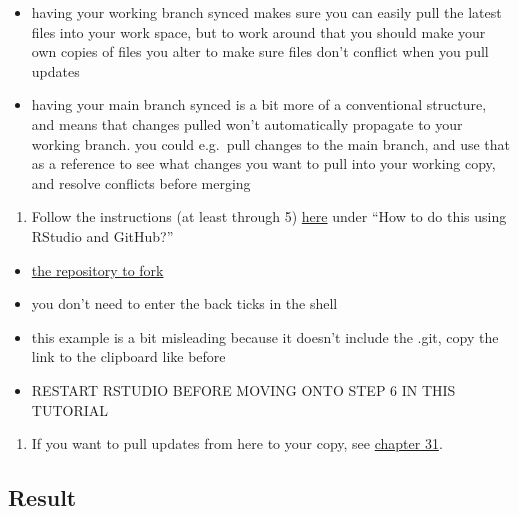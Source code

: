 \documentclass[
]{book}
\providecommand{\tightlist}{%
  \setlength{\itemsep}{0pt}\setlength{\parskip}{0pt}}
\begin{document}
\begin{itemize}
\tightlist
\item
  having your working branch synced makes sure you can easily pull the latest files into your work space, but to work around that you should make your own copies of files you alter to make sure files don't conflict when you pull updates\\
\item
  having your main branch synced is a bit more of a conventional structure, and means that changes pulled won't automatically propagate to your working branch. you could e.g.~pull changes to the main branch, and use that as a reference to see what changes you want to pull into your working copy, and resolve conflicts before merging\\
\end{itemize}

\begin{enumerate}
\def\labelenumi{\arabic{enumi}.}
\setcounter{enumi}{3}
\tightlist
\item
  Follow the instructions (at least through 5) \href{https://r-bio.github.io/intro-git-rstudio/}{here} under ``How to do this using RStudio and GitHub?''
\end{enumerate}

\begin{itemize}
\tightlist
\item
  \href{https://github.com/cellular-tracking-technologies/data_tools}{the repository to fork}
\item
  you don't need to enter the back ticks in the shell\\
\item
  this example is a bit misleading because it doesn't include the .git, copy the link to the clipboard like before\\
\item
  RESTART RSTUDIO BEFORE MOVING ONTO STEP 6 IN THIS TUTORIAL\\
\end{itemize}

\begin{enumerate}
\def\labelenumi{\arabic{enumi}.}
\setcounter{enumi}{4}
\tightlist
\item
  If you want to pull updates from here to your copy, see \href{https://happygitwithr.com/upstream-changes.html\#pull-changes-from-upstream}{chapter 31}.
\end{enumerate}

\subsection*{Result}\label{result}
\end{document}
